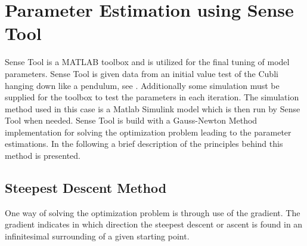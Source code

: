 \section{Parameter Estimation using Sense Tool}
Sense Tool is a MATLAB toolbox and is utilized for the final tuning of model parameters. Sense Tool is given data from an initial value test of the Cubli hanging down like a pendulum, see . Additionally some simulation must be supplied for the toolbox to test the parameters in each iteration. The simulation method used in this case is a Matlab Simulink model which is then run by Sense Tool when needed.
Sense Tool is build with a Gauss-Newton Method implementation for solving the optimization problem leading to the parameter estimations. In the following a brief description of the principles behind this method is presented.

\subsection{Steepest Descent Method}
One way of solving the optimization problem is through use of the gradient. The gradient indicates in which direction the steepest descent or ascent is found in an infinitesimal surrounding of a given starting point.